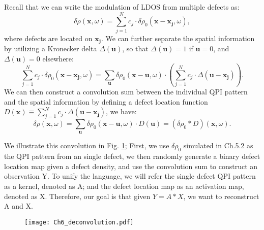 \par \noindent Recall that we can write the modulation of \ac{LDOS} from multiple defects as:
\begin{equation}
	\delta \rho(\mathbf{x}, \omega) = \sum_{j=1}^{N}c_j \cdot \delta \rho_0(\mathbf{x}-\mathbf{x_j},\omega),
\end{equation}
\noindent where defects are located on $\mathbf{x_j}$. We can further separate the spatial information by utilizing a Kronecker delta $\Delta(\mathbf{u})$, so that $\Delta(\mathbf{u})=1$ if $\mathbf{u} = 0$, and $\Delta(\mathbf{u})=0$ elsewhere: 
\begin{equation}
	\sum_{j=1}^{N}c_j \cdot \delta \rho_0(\mathbf{x}-\mathbf{x_j},\omega) = \sum_{\mathbf{u}} \delta \rho_0(\mathbf{x}-\mathbf{u},\omega)\cdot(\sum_{j=1}^{N} c_j \cdot \Delta(\mathbf{u-x_j})).
\end{equation}
\noindent We can then construct a convolution sum between the individual \ac{QPI} pattern and the spatial information by defining a defect location function $D(\mathbf{x}) \equiv \sum_{j=1}^{N} c_j \cdot \Delta(\mathbf{u-x_j})$, we have: 
\begin{equation}
	\delta \rho(\mathbf{x}, \omega) =  \sum_{\mathbf{u}} \delta \rho_0(\mathbf{x}-\mathbf{u},\omega)\cdot D(\mathbf{u}) = (\delta \rho_0 *D)(\mathbf{x}, \omega).
\end{equation}

We illustrate this convolution in Fig. \ref{fig:ch6_decon}; First, we use $\delta \rho_0$ simulated in Ch.5.2 as the \ac{QPI} pattern from an single defect, we then randomly generate a binary defect location map given a defect density, and use the convolution sum to construct an observation Y. To unify the language, we will refer the single defect \ac{QPI} pattern as a kernel, denoted as A; and the defect location map as an activation map, denoted as X. Therefore, our goal is that given $Y = A * X$, we want to reconstruct A and X. 

\begin{figure}
	\texttt{[image: Ch6\_deconvolution.pdf]} 
	\centering
	\caption{}
	\label{fig:ch6_decon}
\end{figure}

